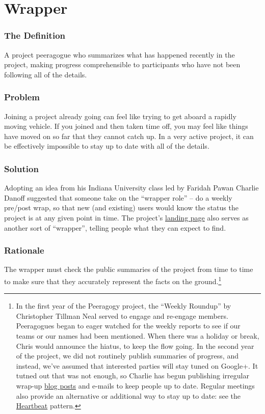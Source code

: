 \section{Wrapper}\label{sec:Wrapper}
\subsubsection*{The Definition} A project peeragogue who summarizes what has happened recently in the project, making progress comprehensible to participants who have not been following all of the details.

\subsubsection*{Problem} Joining a project already going can feel like trying to get aboard a rapidly moving vehicle. If you joined and then taken time off, you may feel like things have moved on so far that they cannot catch up. In a very active project, it can be effectively impossible to stay up to date with all of the details.

\subsubsection*{Solution}
Adopting an idea from his Indiana University class led by Faridah Pawan Charlie Danoff suggested that someone take on the ``wrapper role'' -- do a weekly pre/post wrap, so that new (and existing) users would know the status the project is at any given point in time. The project's \href{http://socialmediaclassroom.com/host/peeragogy/}{landing page} also serves as another sort of ``wrapper'', telling people what they can expect to find.

\subsubsection*{Rationale}
The wrapper must check the public summaries of the project from time to time to make sure that they accurately represent the facts on the ground.\footnote{In the first year of the Peeragogy project, the ``Weekly Roundup'' by Christopher Tillman Neal served to engage and re-engage members. Peeragogues began to eager watched for the weekly reports to see if our teams or our names had been mentioned. When there was a holiday or break, Chris would announce the hiatus, to keep the flow going. In the second year of the project, we did not routinely publish summaries of progress, and instead, we've assumed that interested parties will stay tuned on Google+. It tutned out that was not enough, so Charlie has begun publishing irregular wrap-up \href{http://peeragogy.org/peeragogy-wrapper-post-9-feb-5-apr-2015/}{blog posts} and e-mails to keep people up to date. Regular meetings also provide an alternative or additional way to stay up to date: see the \href{http://peeragogy.org/patterns/heartbeat/}{Heartbeat} pattern.}


